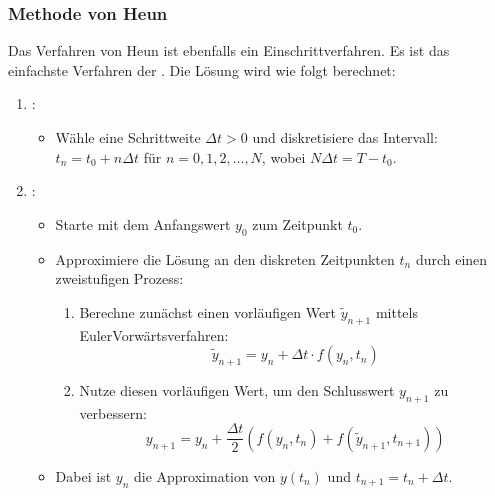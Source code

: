 \documentclass[letterpaper,10pt,german]{jupyterBook}
\begin{document}
\subsubsection{Methode von Heun}
\label{\detokenize{chapters/chapter6/TransienteDynamik:methode-von-heun}}
\sphinxAtStartPar
Das Verfahren von Heun ist ebenfalls ein Einschrittverfahren. Es ist das einfachste Verfahren der . Die Lösung wird wie folgt berechnet:
\begin{enumerate}
%
\item {} 
\sphinxAtStartPar
{}:
\begin{itemize}
\item {} 
\sphinxAtStartPar
Wähle eine Schrittweite \( \Delta t > 0 \) und diskretisiere das Intervall:
\( t_n = t_0 + n \Delta t \) für \( n = 0, 1, 2, \dots, N \), wobei \( N \Delta t = T - t_0 \).

\end{itemize}

\item {} 
\sphinxAtStartPar
{}:
\begin{itemize}
\item {} 
\sphinxAtStartPar
Starte mit dem Anfangswert \( y_0 \) zum Zeitpunkt \( t_0 \).

\item {} 
\sphinxAtStartPar
Approximiere die Lösung an den diskreten Zeitpunkten \( t_n \) durch einen zweistufigen Prozess:
\begin{enumerate}
%
\item {} 
\sphinxAtStartPar
Berechne zunächst einen vorläufigen Wert \( \tilde{y}_{n+1} \) mittels Euler\sphinxhyphen{}Vorwärtsverfahren:
\begin{equation*}
\tilde{y}_{n+1} = y_n + \Delta t \cdot f(y_n, t_n)
\end{equation*}
\item {} 
\sphinxAtStartPar
Nutze diesen vorläufigen Wert, um den Schlusswert \( y_{n+1} \) zu verbessern:
\begin{equation*}
y_{n+1} = y_n + \frac{\Delta t}{2} \left( f(y_n, t_n) + f(\tilde{y}_{n+1}, t_{n+1}) \right)
\end{equation*}
\end{enumerate}

\item {} 
\sphinxAtStartPar
Dabei ist \( y_n \) die Approximation von \( y(t_n) \) und \( t_{n+1} = t_n + \Delta t \).

\end{itemize}

\end{enumerate}
\end{document}
